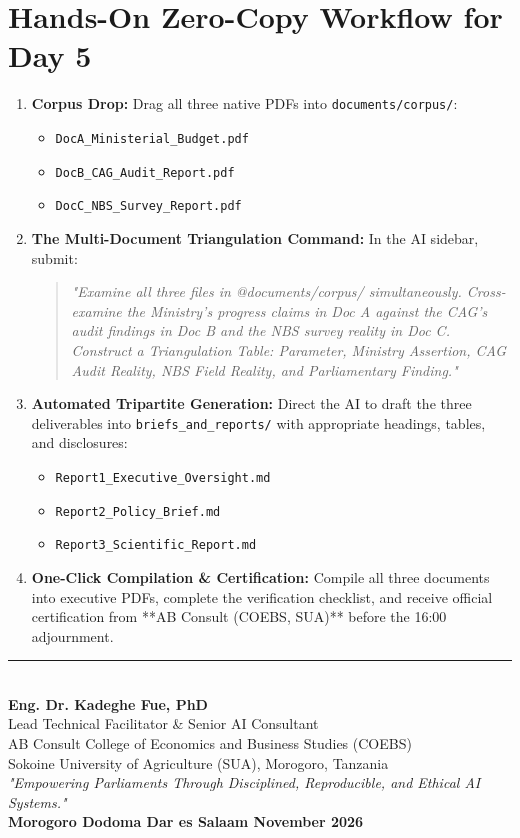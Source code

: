 \documentclass[11pt, a4paper]{report}
\begin{document}
\section{Hands-On Zero-Copy Workflow for Day 5}
\begin{enumerate}[label=\textbf{Step \arabic*:}]
    \item \textbf{Corpus Drop:} Drag all three native PDFs into \texttt{documents/corpus/}:
    \begin{itemize}[label=-]
        \item \texttt{DocA\_Ministerial\_Budget.pdf}
        \item \texttt{DocB\_CAG\_Audit\_Report.pdf}
        \item \texttt{DocC\_NBS\_Survey\_Report.pdf}
    \end{itemize}
    \item \textbf{The Multi-Document Triangulation Command:} In the AI sidebar, submit:
    \begin{quote}
        \small\textit{"Examine all three files in @documents/corpus/ simultaneously. Cross-examine the Ministry's progress claims in Doc A against the CAG's audit findings in Doc B and the NBS survey reality in Doc C. Construct a Triangulation Table: Parameter, Ministry Assertion, CAG Audit Reality, NBS Field Reality, and Parliamentary Finding."}
    \end{quote}
    \item \textbf{Automated Tripartite Generation:} Direct the AI to draft the three deliverables into \texttt{briefs\_and\_reports/} with appropriate headings, tables, and disclosures:
    \begin{itemize}[label=-]
        \item \texttt{Report1\_Executive\_Oversight.md}
        \item \texttt{Report2\_Policy\_Brief.md}
        \item \texttt{Report3\_Scientific\_Report.md}
    \end{itemize}
    \item \textbf{One-Click Compilation \& Certification:} Compile all three documents into executive PDFs, complete the verification checklist, and receive official certification from **AB Consult (COEBS, SUA)** before the 16:00 adjournment.
\end{enumerate}

\vspace{1.5cm}
\begin{center}
    \rule{0.65\textwidth}{0.4pt}\\[0.3cm]
    \textbf{\Large Eng. Dr. Kadeghe Fue, PhD}\\
    Lead Technical Facilitator \& Senior AI Consultant\\
    AB Consult \textbullet{} College of Economics and Business Studies (COEBS)\\
    Sokoine University of Agriculture (SUA), Morogoro, Tanzania\\[0.3cm]
    \small\textit{"Empowering Parliaments Through Disciplined, Reproducible, and Ethical AI Systems."}\\[0.5cm]
    \textbf{Morogoro \textbullet{} Dodoma \textbullet{} Dar es Salaam \textbullet{} November 2026}
\end{center}
\end{document}
